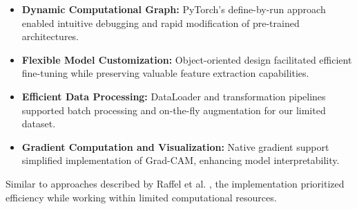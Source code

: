 \documentclass[a4paper,12pt]{report}
\begin{document}
\begin{itemize}
    \item \textbf{Dynamic Computational Graph:} PyTorch's define-by-run approach enabled 
    intuitive debugging and rapid modification of pre-trained architectures.
    
    \item \textbf{Flexible Model Customization:} Object-oriented design facilitated efficient
    fine-tuning while preserving valuable feature extraction capabilities.
    
    \item \textbf{Efficient Data Processing:} DataLoader and transformation pipelines supported
    batch processing and on-the-fly augmentation for our limited dataset.
    
    \item \textbf{Gradient Computation and Visualization:} Native gradient support simplified
    implementation of Grad-CAM, enhancing model interpretability.
\end{itemize}

Similar to approaches described by Raffel et al. \citet{raffel2023}, the implementation prioritized efficiency while working within limited computational resources.





\end{document}

